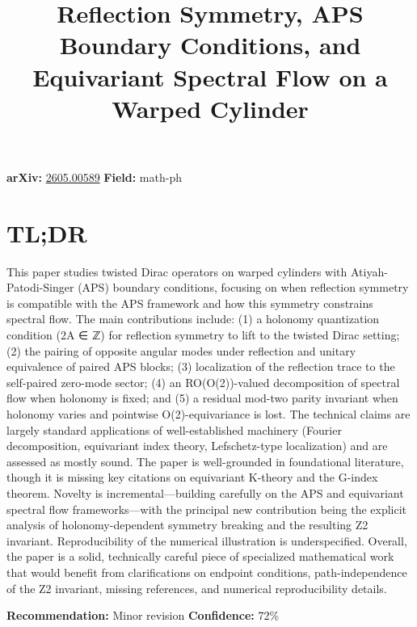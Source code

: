 \documentclass[11pt]{article}
\title{Reflection Symmetry, APS Boundary Conditions, and Equivariant Spectral Flow on a Warped Cylinder}
\date{}
\begin{document}
\maketitle

\noindent\textbf{arXiv:} \href{https://arxiv.org/abs/2605.00589}{2605.00589} \quad \textbf{Field:} math-ph\\

\section*{TL;DR}
This paper studies twisted Dirac operators on warped cylinders with Atiyah-Patodi-Singer (APS) boundary conditions, focusing on when reflection symmetry is compatible with the APS framework and how this symmetry constrains spectral flow. The main contributions include: (1) a holonomy quantization condition (2A ∈ ℤ) for reflection symmetry to lift to the twisted Dirac setting; (2) the pairing of opposite angular modes under reflection and unitary equivalence of paired APS blocks; (3) localization of the reflection trace to the self-paired zero-mode sector; (4) an RO(O(2))-valued decomposition of spectral flow when holonomy is fixed; and (5) a residual mod-two parity invariant when holonomy varies and pointwise O(2)-equivariance is lost. The technical claims are largely standard applications of well-established machinery (Fourier decomposition, equivariant index theory, Lefschetz-type localization) and are assessed as mostly sound. The paper is well-grounded in foundational literature, though it is missing key citations on equivariant K-theory and the G-index theorem. Novelty is incremental—building carefully on the APS and equivariant spectral flow frameworks—with the principal new contribution being the explicit analysis of holonomy-dependent symmetry breaking and the resulting Z2 invariant. Reproducibility of the numerical illustration is underspecified. Overall, the paper is a solid, technically careful piece of specialized mathematical work that would benefit from clarifications on endpoint conditions, path-independence of the Z2 invariant, missing references, and numerical reproducibility details.

\textbf{Recommendation:} Minor revision \quad \textbf{Confidence:} 72\%\\
\end{document}
